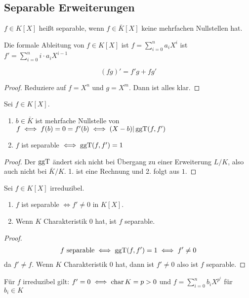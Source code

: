 \subsection{Separable Erweiterungen}
\begin{Def}
    \(f\in K[X]\) heißt separable, wenn \(f\in \bar K[X]\) keine mehrfachen Nullstellen hat.
\end{Def}
\begin{Def}
    Die formale Ableitung von \(f\in K[X]\) ist \( f=\sum_{i=0}^na_iX^i\) ist \(f'=\sum_{i=0}^ni\cdot a_iX^{i-1}\)
\end{Def}
\begin{Lemma}
    \[(fg)'=f'g+fg'\]
\end{Lemma}
\begin{proof}
    Reduziere auf \(f=X^n\) und \(g=X^m\). Dann ist alles klar.
\end{proof}
\begin{Lemma}
    Sei \(f\in K[X]\).
    \begin{enumerate}
        \item \(b\in \bar K\) ist mehrfache Nullstelle von \(f\iff f(b)=0=f'(b)\iff (X-b)| \operatorname{ggT}(f,f')\)
        \item \(f\) ist separable \(\iff \operatorname{ggT}(f,f')=1\)
    \end{enumerate}
\end{Lemma}
\begin{proof}
    Der \(\operatorname{ggT}\) ändert sich nicht bei Übergang zu einer Erweiterung \(L/K\), also auch nicht bei \(\bar K/K\). 1. ist eine Rechnung und 2. folgt aus \(1\).
\end{proof}
\begin{Satz}
    Sei \(f\in K[X]\) irreduzibel.
    \begin{enumerate}
        \item \(f\) ist separable \(\iff f'\neq 0\) in \(K[X]\).
        \item Wenn \(K\) Charakteristik \(0\) hat, ist \(f\) separable.
    \end{enumerate}
\end{Satz}
\begin{proof}
    \begin{align*}
        f \text{ separable}\iff\operatorname{ggT}(f,f')=1\iff f'\neq 0
    \end{align*} da \(f'\neq f\).
    Wenn \(K\) Charakteristik 0 hat, dann ist \(f'\neq 0\) also ist \(f\) separable.
\end{proof}
\begin{Bem} Für \(f\) irreduzibel gilt:
    \(f'=0\iff \operatorname{char} K=p>0\) und \(f=\sum_{i=0}^nb_iX^{p^i}\) für \(b_i\in K\)
\end{Bem}
